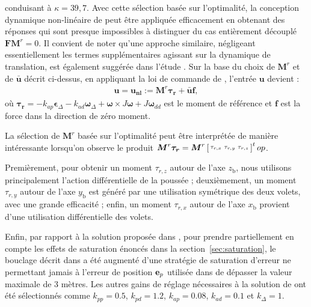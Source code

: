 conduisant à $\kappa = 39,7$. Avec cette sélection basée sur l'optimalité, la conception dynamique non-linéaire de \cite{2020e-MicCenZacFra} peut être appliquée efficacement en obtenant des réponses qui sont presque impossibles à distinguer du cas entièrement découplé 
$\boldsymbol{F}\boldsymbol{M}^r=0$. Il convient de noter qu'une approche similaire, négligeant essentiellement les termes supplémentaires agissant sur la dynamique de translation, est également suggérée dans l'étude \cite{hamel_minhduc}. 
Sur la base du choix de $\boldsymbol{M}^r$ et de $\boldsymbol{\bar u}$ décrit ci-dessus, en appliquant la loi de commande de \cite[eqn (19)]{2020e-MicCenZacFra}, l'entrée $\boldsymbol{u}$ devient :
\begin{align}
\label{eq:u_nonlin}
    \boldsymbol{u} = \boldsymbol{u_{\text{nl}}} := \boldsymbol{M}^r \boldsymbol{\tau_{r}} + \boldsymbol{\bar u} \boldsymbol{f},
\end{align}
où $\boldsymbol{\tau_{r}} = -k_{ap} \boldsymbol{\epsilon}_{\Delta} - k_{ad} \boldsymbol{\omega}_{\Delta} + \boldsymbol{\omega} \times J \boldsymbol{\omega} + J \boldsymbol{\omega}_{dd}$ est le moment de référence et $\boldsymbol{f}$ est la force dans la direction de zéro moment. 

La sélection de $\boldsymbol{M}^r$ basée sur l'optimalité peut être interprétée de manière intéressante lorsqu'on observe le produit $\boldsymbol{M}^r \boldsymbol{\tau_{r}} = \boldsymbol{M}^r \left[ \begin{smallmatrix}\tau_{r,x} & \tau_{r,y} & \tau_{r,z} \end{smallmatrix} \right]^top$. 

Premièrement, pour obtenir un moment $\tau_{r,z}$ autour de l'axe $z_{\text{b}}$, nous utilisons principalement l'action différentielle de la poussée ; deuxièmement, un moment $\tau_{r,y}$ autour de l'axe $y_{\text{b}}$ est généré par une utilisation symétrique des deux volets, avec une grande efficacité ; enfin, un moment $\tau_{r,x}$ autour de l'axe $x_{\text{b}}$ provient d'une utilisation différentielle des volets. 

Enfin, par rapport à la solution proposée dans \cite{2020e-MicCenZacFra}, pour prendre partiellement en compte les effets de saturation énoncés dans la section~\ref{sec:saturation}, le bouclage décrit dans \cite{2020e-MicCenZacFra} a été augmenté d'une stratégie de saturation d'erreur ne permettant jamais à l'erreur de position $\boldsymbol{\rm e}_p$ utilisée dans \cite[eqn. (22)]{2020e-MicCenZacFra} de dépasser la valeur maximale de 3 mètres. Les autres gains de réglage nécessaires à la solution de \cite{2020e-MicCenZacFra} ont été sélectionnés comme $k_{pp} = 0.5$, $k_{pd} = 1.2$, $k_{ap} = 0.08$, $k_{ad} = 0.1$ et $k_{\Delta} = 1$.
 

